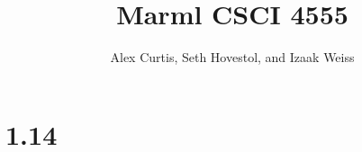 \documentclass[12pt]{article}
\begin{document}
\title{Marml CSCI 4555}
\date{}
\author{Alex Curtis, Seth Hovestol, and Izaak Weiss}
\maketitle{}

\newcommand{\finish}[1]{\todo[inline]{#1}} %

\section{1.14}
\end{document}
